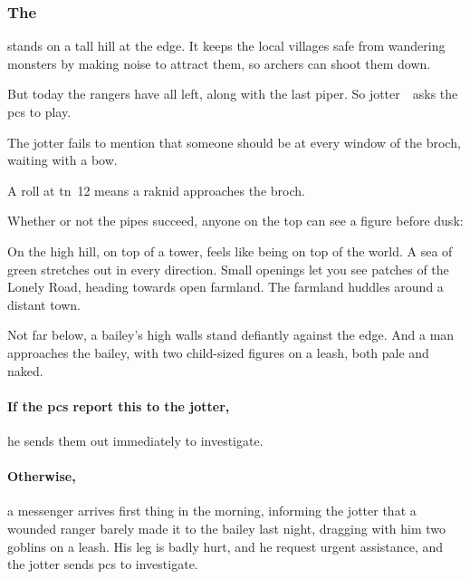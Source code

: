 \documentclass[10pt,twoside]{book}
\begin{document}


\clearpage

\pagestyle{minizine}%

\subsubsection{The }
stands on a tall hill at the \gls{edge}.
It keeps the local \glspl{village} safe from wandering \glspl{monster} by making noise to attract them, so  archers can shoot them down.

But today the \glspl{ranger} have all left, along with the last piper.
So \gls{jotter}~\fjot\ asks the \glspl{pc} to play.

The \gls{jotter} fails to mention that someone should be at every window of the \gls{broch}, waiting with a bow.

A  roll at \gls{tn}~12 means a raknid approaches the \gls{broch}.

Whether or not the pipes succeed, anyone on the top can see a figure before dusk:

\begin{boxtext}
  On the high hill, on top of a tower, feels like being on top of the world.
  A sea of green stretches out in every direction.
  Small openings let you see patches of the Lonely Road, heading towards open farmland.
  The farmland huddles around a distant town.
  
  Not far below, a bailey's high walls stand defiantly against the \gls{edge}.
  And a man approaches the bailey, with two child-sized figures on a leash, both pale and naked.
\end{boxtext}

\paragraph{If the \glspl{pc} report this to the \gls{jotter},}
he sends them out immediately to investigate.

\paragraph{Otherwise,}
a messenger arrives first thing in the morning, informing the \gls{jotter} that a wounded \gls{ranger} barely made it to the bailey last night, dragging with him two goblins on a leash.
His leg is badly hurt, and he request urgent assistance, and the \gls{jotter} sends \glspl{pc} to investigate.
\end{document}

